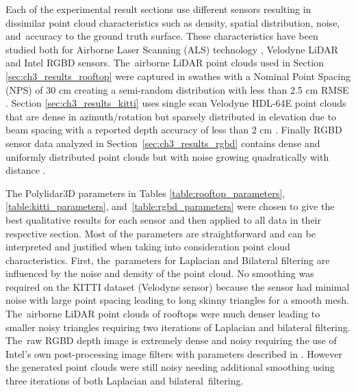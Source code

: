 Each of the experimental result sections use different sensors resulting in dissimilar point cloud characteristics such as density, spatial distribution, noise, and~accuracy to the ground truth surface. These characteristics have been studied both for Airborne Laser Scanning (ALS) technology {\cite{balsa-barreiro_airborne_2012, graham_random_2014}}, Velodyne LiDAR {\cite{bergelt_improving_2017}} and Intel RGBD {\cite{ahn_analysis_2019}} sensors. The~airborne LiDAR point clouds used in Section {\ref{sec:ch3_results_rooftop}} were captured in swathes with a Nominal Point Spacing (NPS) of 30 cm creating a semi-random distribution with less than 2.5 cm RMSE {\cite{lidar_germany}}. Section {\ref{sec:ch3_results_kitti}} uses single scan Velodyne HDL-64E point clouds that are dense in azimuth/rotation but sparsely distributed in  elevation due to beam spacing with a reported depth accuracy of less than 2 cm {\cite{geiger_vision_2013}}. Finally RGBD sensor data analyzed in Section~{\ref{sec:ch3_results_rgbd}} contains dense and uniformly distributed point clouds but with noise growing quadratically with distance {\cite{noauthor_github_2020-4}}.

The Polylidar3D parameters in Tables {\ref{table:rooftop_parameters}}, {\ref{table:kitti_parameters}}, and~{\ref{table:rgbd_parameters}} were chosen to give the best qualitative results for each sensor and then applied to all data in their respective section. Most of the parameters are straightforward and can be interpreted and justified when taking into consideration point cloud characteristics. First, the~parameters for Laplacian and Bilateral filtering are influenced by the noise and density of the point cloud. No smoothing was required on the KITTI dataset (Velodyne sensor) because the sensor had minimal noise with large point spacing leading to long skinny triangles for a smooth mesh. The~airborne LiDAR point clouds of rooftops were much denser leading to smaller noisy triangles requiring two iterations of Laplacian and bilateral filtering. The~raw RGBD depth image is extremely dense and noisy requiring the use of Intel's own post-processing image filters with parameters described in {\cite{noauthor_github_2019-1}}. However the generated point clouds were still noisy needing additional smoothing using three iterations of both Laplacian and bilateral~filtering.

